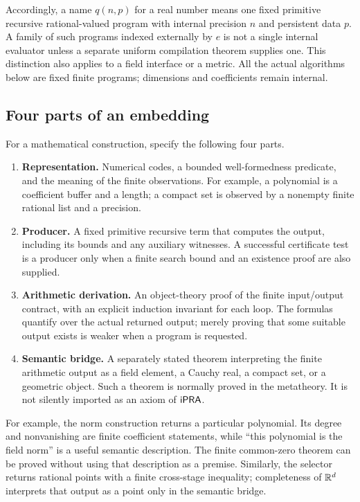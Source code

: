 Accordingly, a name $q(n,p)$ for a real number means one fixed primitive recursive rational-valued program with internal precision $n$ and persistent data $p$. A family of such programs indexed externally by $e$ is not a single internal evaluator unless a separate uniform compilation theorem supplies one. This distinction also applies to a field interface or a metric. All the actual algorithms below are fixed finite programs; dimensions and coefficients remain internal.

\subsection{Four parts of an embedding}

For a mathematical construction, specify the following four parts.

\begin{enumerate}
\item \textbf{Representation.} Numerical codes, a bounded well-formedness predicate, and the meaning of the finite observations. For example, a polynomial is a coefficient buffer and a length; a compact set is observed by a nonempty finite rational list and a precision.
\item \textbf{Producer.} A fixed primitive recursive term that computes the output, including its bounds and any auxiliary witnesses. A successful certificate test is a producer only when a finite search bound and an existence proof are also supplied.
\item \textbf{Arithmetic derivation.} An object-theory proof of the finite input/output contract, with an explicit induction invariant for each loop. The formulas quantify over the actual returned output; merely proving that some suitable output exists is weaker when a program is requested.
\item \textbf{Semantic bridge.} A separately stated theorem interpreting the finite arithmetic output as a field element, a Cauchy real, a compact set, or a geometric object. Such a theorem is normally proved in the metatheory. It is not silently imported as an axiom of $\mathsf{iPRA}$.
\end{enumerate}

For example, the norm construction returns a particular polynomial. Its degree and nonvanishing are finite coefficient statements, while ``this polynomial is the field norm'' is a useful semantic description. The finite common-zero theorem can be proved without using that description as a premise. Similarly, the selector returns rational points with a finite cross-stage inequality; completeness of $\mathbb R^d$ interprets that output as a point only in the semantic bridge.

